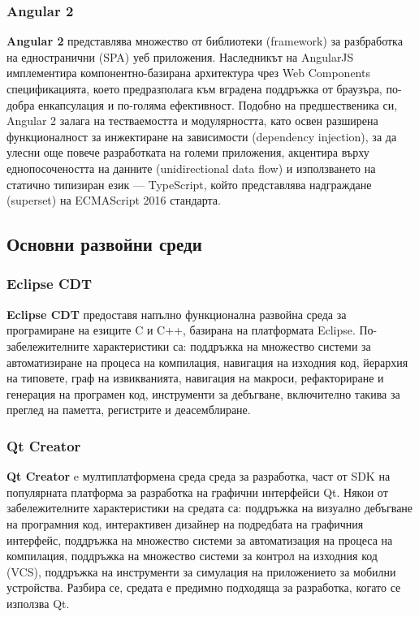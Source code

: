 \documentclass[12pt,a4paper,oneside]{book}
\begin{document}
\subsubsection{Angular 2}

\textbf{Angular 2} представлява множество от библиотеки (framework) за разбработка на едностранични
(SPA) уеб приложения. Наследникът на AngularJS имплементира компонентно-базирана
архитектура чрез Web Components спецификацията, което предразполага към вградена
поддръжка от браузъра, по-добра енкапсулация и по-голяма ефективност. Подобно на
предшественика си, Angular 2 залага на тестваемостта и модулярността, като освен
разширена функционалност за инжектиране на зависимости (dependency injection),
за да улесни още повече разработката на големи приложения,
акцентира върху еднопосочеността на данните (unidirectional data flow) и
използването на статично типизиран език --- TypeScript, който представлява
надграждане (superset) на ECMAScript 2016 стандарта.

\subsection{Основни развойни среди}

\subsubsection{Eclipse CDT}

\textbf{Eclipse CDT} предоставя напълно функционална развойна среда за програмиране на
езиците C и C++, базирана на платформата Eclipse. По-забележителните
характеристики са: поддръжка на множество системи за автоматизиране на процеса
на компилация, навигация на изходния код, йерархия на типовете, граф на
извикванията, навигация на макроси, рефакториране и генерация на програмен код,
инструменти за дебъгване, включително такива за преглед на паметта, регистрите и
деасемблиране.

\subsubsection{Qt Creator}

\textbf{Qt Creator} e мултиплатформена среда среда за разработка, част от
SDK на популярната платформа за разработка на графични
интерфейси Qt. Някои от забележителните характеристики на средата са: поддръжка
на визуално дебъгване на програмния код, интерактивен дизайнер на подредбата на
графичния интерфейс, поддръжка на множество системи за автоматизация на процеса
на компилация, поддръжка на множество системи за контрол на изходния код (VCS),
поддръжка на инструменти за симулация на приложението за мобилни устройства.
Разбира се, средата е предимно подходяща за разработка, когато се използва Qt.
\end{document}
